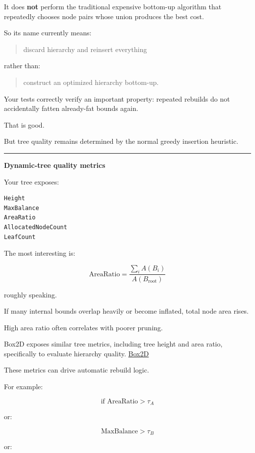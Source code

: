 It does \textbf{not} perform the traditional expensive bottom-up algorithm that repeatedly chooses node pairs whose union produces the best cost.

So its name currently means:

\begin{quote}
discard hierarchy and reinsert everything
\end{quote}

rather than:

\begin{quote}
construct an optimized hierarchy bottom-up.
\end{quote}

Your tests correctly verify an important property: repeated rebuilds do not accidentally fatten already-fat bounds again.

That is good.

But tree quality remains determined by the normal greedy insertion heuristic.

\begin{center}\rule{0.5\linewidth}{0.5pt}\end{center}

\textbf{Dynamic-tree quality metrics}

Your tree exposes:

\begin{verbatim}
Height
MaxBalance
AreaRatio
AllocatedNodeCount
LeafCount
\end{verbatim}

The most interesting is:

\[
\boxed{
\text{AreaRatio}
=
\frac{
\sum_i A(B_i)
}{
A(B_{\text{root}})
}
}
\]

roughly speaking.

If many internal bounds overlap heavily or become inflated, total node area rises.

High area ratio often correlates with poorer pruning.

Box2D exposes similar tree metrics, including tree height and area ratio, specifically to evaluate hierarchy quality. \href{https://box2d.org/documentation/group__tree.html?utm_source=chatgpt.com}{Box2D}

These metrics can drive automatic rebuild logic.

For example:

\[
\text{if AreaRatio}>\tau_A
\]

or:

\[
\text{MaxBalance}>\tau_B
\]

or:

